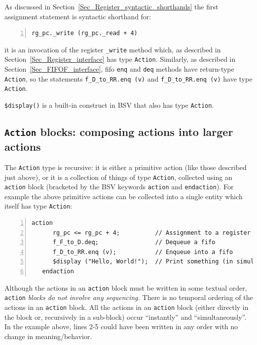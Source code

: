 As discussed in Section~\ref{Sec_Register_syntactic_shorthands} the
first assignment statement is syntactic shorthand for:

{\small
\begin{Verbatim}[frame=single, numbers=left]
   rg_pc._write (rg_pc._read + 4)
\end{Verbatim}
}

{\ie} it is an invocation of the register \verb|_write| method which,
as described in
Section~\ref{Sec_Register_interface} has type
\verb|Action|.  Similarly, as described in
Section~\ref{Sec_FIFOF_interface}, fifo \verb|enq|
and \verb|deq| methods have return-type \verb|Action|, so the
statements \verb|f_D_to_RR.enq (v)| and \verb|f_D_to_RR.enq (v)| have
type \verb|Action|.


\verb|$display()| is a built-in construct in BSV that also has type
\verb|Action|.


\subsection{{\tt Action} blocks: composing actions into larger actions}


The \verb|Action| type is recursive: it is either a primitive action
(like those described just above), or it is a collection of things of
type \verb|Action|, collected using an \verb|action| block (bracketed
by the BSV keywords \verb|action| and \verb|endaction|).  For example
the above primitive actions can be collected into a single entity
which itself has type \verb|Action|:

{\small
\begin{Verbatim}[frame=single, numbers=left]
   action
      rg_pc <= rg_pc + 4;          // Assignment to a register
      f_F_to_D.deq;                // Dequeue a fifo
      f_D_to_RR.enq (v);           // Enqueue into a fifo
      $display ("Hello, World!");  // Print something (in simulation only)
   endaction
\end{Verbatim}
}

Although the actions in an \verb|action| block must be written in some
textual order, \verb|action| \emph{blocks do not involve any
sequencing.}  There is no temporal ordering of the actions in an
\verb|action| block.  All the actions in an \verb|action| block
(either directly in the block or, recursively in a sub-block) occur
``instantly'' and ``simultaneously''.  In the example above, lines 2-5
could have been written in any order with no change in
meaning/behavior.

